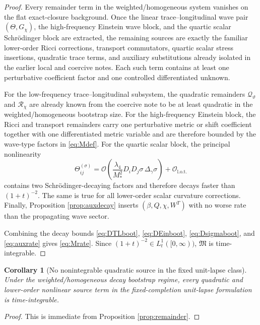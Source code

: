 \documentclass[11pt]{article}
\newtheorem{corollary}{Corollary}
\begin{document}
\begin{proof}
Every remainder term in the weighted/homogeneous system vanishes on the flat exact-closure background. Once the linear trace--longitudinal wave pair \((\Theta,G_\chi)\), the high-frequency Einstein wave block, and the quartic scalar Schr\"odinger block are extracted, the remaining sources are exactly the familiar lower-order Ricci corrections, transport commutators, quartic scalar stress insertions, quadratic trace terms, and auxiliary substitutions already isolated in the earlier local and coercive notes. Each such term contains at least one perturbative coefficient factor and one controlled differentiated unknown.

For the low-frequency trace--longitudinal subsystem, the quadratic remainders \(\mathcal Q_\vartheta\) and \(\mathcal R_\chi\) are already known from the coercive note to be at least quadratic in the weighted/homogeneous bootstrap size. For the high-frequency Einstein block, the Ricci and transport remainders carry one perturbative metric or shift coefficient together with one differentiated metric variable and are therefore bounded by the wave-type factors in \eqref{eq:Mdef}. For the quartic scalar block, the principal nonlinearity
\[
\Theta_{ij}^{(\sigma)}
=
\mathcal O\!\left(\frac{\lambda_4}{M_*^2}D_iD_j\sigma\,\Delta_\gamma\sigma\right)
+ \mathcal O_{\mathrm{l.o.t.}}
\]
contains two Schr\"odinger-decaying factors and therefore decays faster than \((1+t)^{-2}\). The same is true for all lower-order scalar curvature corrections. Finally, Proposition \ref{prop:auxdecay} inserts \((\beta,Q,\chi,W^T)\) with no worse rate than the propagating wave sector.

Combining the decay bounds \eqref{eq:DTLboot}, \eqref{eq:DEinboot}, \eqref{eq:Dsigmaboot}, and \eqref{eq:auxrate} gives \eqref{eq:Mrate}. Since \((1+t)^{-2}\in L_t^1([0,\infty))\), \(\mathfrak M\) is time-integrable.
\end{proof}

\begin{corollary}[No nonintegrable quadratic source in the fixed unit-lapse class]
\label{cor:noquadobs}
Under the weighted/homogeneous decay bootstrap regime, every quadratic and lower-order nonlinear source term in the fixed-completion unit-lapse formulation is time-integrable.
\end{corollary}

\begin{proof}
This is immediate from Proposition \ref{prop:remainder}.
\end{proof}
\end{document}
